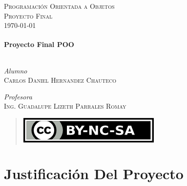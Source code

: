 \documentclass[12pt]{article}
\newcommand{\documentTitle}{Proyecto Final POO}
\newcommand{\Creador}{Carlos Daniel Hernandez Chauteco}
\newcommand{\profesor}{Ing. Guadalupe Lizeth Parrales Romay}
\begin{document}
\begin{titlepage}
\textsc{\Large Programación Orientada a Objetos}\\[0.5cm]
\textsc{\large Proyecto Final}\\[0.5cm]
{\large \today}\\[1cm]%

\HRule \\[0.4cm]
{ \huge \bfseries \documentTitle}\\[0.1cm]
\HRule \\[1.5cm]
 
\begin{minipage}{0.4\textwidth}
\begin{flushleft} \large
\emph{Alumno}\\
\textsc{\Creador} 
\end{flushleft}


\begin{flushleft} \large

\emph{Profesora}\\
\textsc{\profesor} %
\end{flushleft}

\end{minipage}

\vfill
\hfill
\newline
\begin{quote}
    \hfill
    \includegraphics{by-nc-sa.png}
\end{quote}

\vfill %

\end{titlepage}
\newpage


\section{Justificación Del Proyecto}

\end{document}
